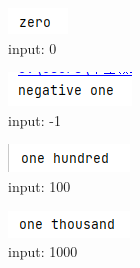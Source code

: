     \begin{figure}[H]
        \centering
        \begin{subfigure}{0.13\linewidth}
            \centering
            \includegraphics[width=0.5\linewidth]{../pic/2/2.1.png}
            \caption{input: 0}
        \end{subfigure}
        \begin{subfigure}{0.17\linewidth}
            \centering
            \includegraphics[width=1\linewidth]{../pic/2/2.2.png}
            \caption{input: -1}
        \end{subfigure}
        \begin{subfigure}{0.17\linewidth}
            \centering
            \includegraphics[width=1\linewidth]{../pic/2/2.3.png}
            \caption{input: 100}
        \end{subfigure}
        \begin{subfigure}{0.17\linewidth}
            \centering
            \includegraphics[width = 1\linewidth]{../pic/2/2.4.png}
            \caption{input: 1000}
        \end{subfigure}
        \begin{subfigure}{0.27\linewidth}

\end{subfigure}
\end{figure}
